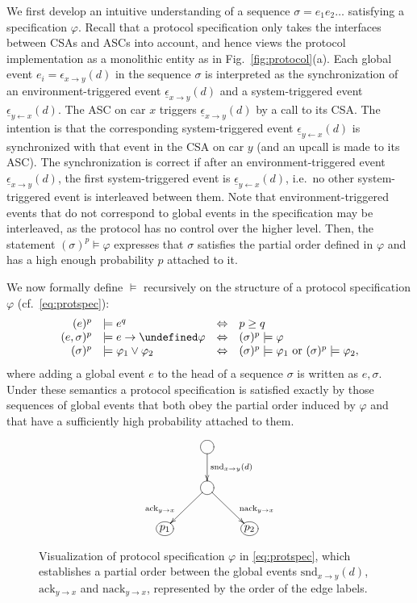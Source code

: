 \documentclass{sig-alternate}
\let\next\undefined
\DeclareMathOperator{\next}{\mathop\bigcirc}
\renewcommand{\v}{\varphi}
\newcommand{\e}{\epsilon}
\newcommand{\locev}[1]{\underline{#1}}
\newcommand{\snd}{\mathrm{snd}}
\newcommand{\ack}{\mathrm{ack}}
\newcommand{\nack}{\mathrm{nack}}
\newcommand{\glob}[4]{{#1}_{{#2} \rightarrow {#3}}(#4)}
\newcommand{\env}[4]{\locev{#1}_{{#2} \rightarrow {#3}}(#4)}
\newcommand{\sys}[4]{\locev{#1}_{{#2} \leftarrow {#3}}(#4)}
\newcommand{\fig}[1]{Fig.\ \ref{fig:#1}}
\newcommand{\figvspace}{\vspace{-0.2in}}
\begin{document}
We first develop an intuitive understanding of a sequence $\sigma = e_1e_2\ldots$ satisfying a specification $\v$. Recall that a protocol specification only takes the interfaces between CSAs and ASCs into account, and hence views the protocol implementation as a monolithic entity as in \fig{protocol}(a). Each global event $e_i = \glob{\e}{x}{y}{d}$ in the sequence $\sigma$ is interpreted as the synchronization of an environment-triggered event $\env{\e}{x}{y}{d}$ and a system-triggered event $\sys{\e}{y}{x}{d}$. The ASC on car $x$ triggers $\env{\e}{x}{y}{d}$ by a call to its CSA. The intention is that the corresponding system-triggered event $\sys{\e}{y}{x}{d}$ is synchronized with that event in the CSA on car $y$ (and an upcall is made to its ASC). The synchronization is correct if after an environment-triggered event $\env{\e}{x}{y}{d}$, the first system-triggered event is $\sys{\e}{y}{x}{d}$, i.e.\ no other system-triggered event is interleaved between them. Note that environment-triggered events that do not correspond to global events in the specification may be interleaved, as the protocol has no control over the higher level. Then, the statement $(\sigma)^p \models \v$ expresses that $\sigma$ satisfies the partial order defined in $\v$ and has a high enough probability $p$ attached to it.

We now formally define $\models$ recursively on the structure of a protocol specification $\v$ (cf.\ \eqref{eq:protspec}):
\begin{equation}
\begin{array}{rlll}
	(e)^p &\models e^q &\Leftrightarrow & p \geq q \\
	(e, \sigma)^p &\models e \rightarrow\next\v &\Leftrightarrow & (\sigma)^p \models \v \\
	(\sigma)^p &\models \v_1 \vee \v_2 &\Leftrightarrow &(\sigma)^p \models \v_1 \mathrm{~or~} (\sigma)^p \models \v_2,
\end{array}
\end{equation}
where adding a global event $e$ to the head of a sequence $\sigma$ is written as $e, \sigma$. Under these semantics a protocol specification is satisfied exactly by those sequences of global events that both obey the partial order induced by $\varphi$ and that have a sufficiently high probability attached to them.

\begin{figure}
\centering
\begin{displaymath}
\xymatrix{ & *++[o][F-]{} \ar[d]^{\snd_{x \rightarrow y}(d)} \\ & *++[o][F-]{} \ar[dl]_(0.7){\ack_{y \rightarrow x}} \ar[dr]^(0.7){\nack_{y \rightarrow x}} \\ *+[o][F-]{p_1} & & *+[o][F-]{p_2}}
\end{displaymath}
\figvspace
\caption{Visualization of protocol specification $\v$ in \eqref{eq:protspec}, which establishes a partial order between the global events $\snd_{x \rightarrow y}(d)$, $\ack_{y \rightarrow x}$ and $\nack_{y \rightarrow x}$, represented by the order of the edge labels.}
\label{fig:protspec}
\figvspace
\end{figure}
\end{document}
